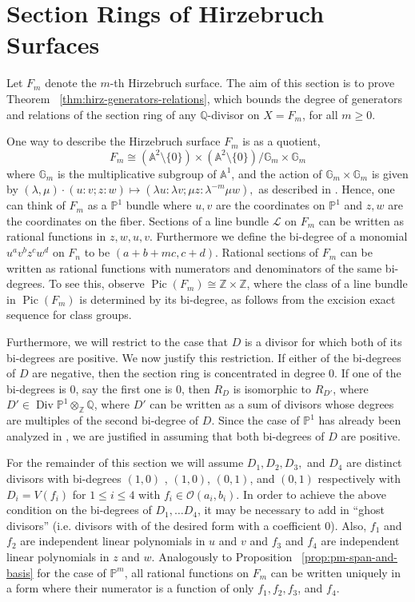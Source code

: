 \documentclass{amsart}
\theoremstyle{plain}
\theoremstyle{definition}
\theoremstyle{remark}
\numberwithin{equation}{section}
\newcommand\bq{{\mathbb Q}}
\newcommand\bp{{\mathbb P}}
\newcommand\bz{{\mathbb Z}}
\newcommand\ba{{\mathbb A}}
\newcommand\sco{{\mathscr O}}
\DeclareMathOperator\di{Div}
\newcommand\bida{a}
\newcommand\bidb{b}
\newcommand\hirz{F}
\DeclareMathOperator{\Pic}{Pic}
\newcommand\invisiblesubsection{%
  \refstepcounter{subsection}%
}
\begin{document}
\section{Section Rings of Hirzebruch Surfaces}
\label{sec:hirz}
\invisiblesubsection
Let $\hirz_m$ denote the $m$-th Hirzebruch surface.
The aim of this section is to prove Theorem
~\ref{thm:hirz-generators-relations}, which bounds the degree of
generators and relations of the section ring of any $\bq$-divisor
on $X = \hirz_m$, for all $m \geq 0$.

One way to describe the Hirzebruch surface $\hirz_m$ is as a
quotient,
\[
\hirz_m \cong (\ba^2 \setminus \{0\}) \times (\ba^2 \setminus \{0\})/\mathbb G_m \times \mathbb G_m
\]
where $\mathbb G_m$ is the multiplicative subgroup of $\ba^1$, and the action of $\mathbb G_m \times \mathbb G_m$ is given by
$(\lambda, \mu) \cdot (u\colon v; z\colon w) \mapsto (\lambda u\colon \lambda v; \mu z\colon \lambda^{-m} \mu w),$ as described in \cite[p.~ 6]{zhao:counting-cubic}. Hence, one can think of
$\hirz_m$ as a $\bp^1$ bundle where $u,v$ are the coordinates on
$\bp^1$ and $z,w$ are the coordinates on the fiber.
Sections of a line bundle $\mathscr L$ on $\hirz_m$ can be written as
rational functions in $z, w, u, v$.
Furthermore we define the bi-degree of a monomial $u^a v^{b} z^c w^d$
on $\hirz_n$ to be
$(a + b + mc, c + d)$. Rational sections of $\hirz_m$ can be written as
rational functions with numerators and denominators of the same bi-degrees. To see this, 
observe
$\Pic(\hirz_m) \cong \bz \times \bz$, where the class of a line bundle
in $\Pic(\hirz_m)$
is determined by its bi-degree, as follows from the excision exact sequence
for class groups.

Furthermore, we will restrict to the case that $D$ is a divisor
for which both of its bi-degrees are positive. We now justify this
restriction. If either of the bi-degrees of $D$ are negative,
then the section ring is concentrated in degree 0. If one of the
bi-degrees is 0, say the first one is 0, then $R_D$ is isomorphic
to $R_{D'}$, where $D' \in \di \bp^1 \otimes_\bz \bq$, 
where $D'$ can be written as a sum of divisors whose degrees
are multiples of the second bi-degree of $D$. Since the case of
$\bp^1$ has already been analyzed in \cite{dorney:canonical}, we
are justified in assuming that both bi-degrees of $D$ are positive.


For the remainder of this section we will assume $D_1, D_2, D_3,$ and $D_4$ are
distinct divisors with bi-degrees $(1,0)$
, $(1,0)$, $(0,1)$, and $(0,1)$ respectively with $D_i = V(f_i)$ for $1 \leq i \leq 4$ with $f_i \in \sco(\bida_i, \bidb_i)$.  
In order to achieve the above condition on the bi-degrees of
$D_1, \ldots D_4$, it may be necessary to add in ``ghost divisors'' (i.e.
divisors with of the desired form with a coefficient $0$).
Also, $f_1$ and $f_2$ are independent linear
polynomials in $u$ and $v$ and $f_3$ and $f_4$ are independent
linear polynomials in $z$ and $w$.
Analogously to Proposition ~\ref{prop:pm-span-and-basis} for the case
of $\bp^m$, all rational functions on $\hirz_m$
can be written uniquely in a form where their numerator is a function
of only $f_1,f_2,f_3$, and $f_4$.
\end{document}
